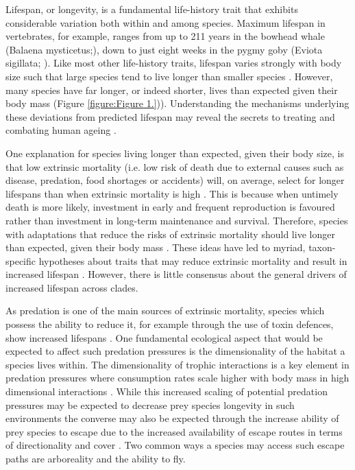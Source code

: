 Lifespan, or longevity, is a fundamental life-history trait that exhibits considerable variation both within and among species. Maximum lifespan in vertebrates, for example, ranges from up to 211 years in the bowhead whale (Balaena mysticetus;\citep{de2009database}), down to just eight weeks in the pygmy goby (Eviota sigillata; \citep{depczynski2005shortest}). Like most other life-history traits, lifespan varies strongly with body size such that large species tend to live longer than smaller species \citep{lindstedt1981body,promislow1993size,de2007analysis,ricklefs2010life}. However, many species have far longer, or indeed shorter, lives than expected given their body mass (Figure \ref{figure:Figure 1.})). Understanding the mechanisms underlying these deviations from predicted lifespan may reveal the secrets to treating and combating human ageing \citep{ricklefs2010insights,zhang2013comparative}. 

One explanation for species living longer than expected, given their body size, is that low extrinsic mortality (i.e. low risk of death due to external causes such as disease, predation, food shortages  or accidents) will, on average, select for longer lifespans than when extrinsic mortality is high \citep{stearns1992evolution,Williams1957}. This is because when untimely death is more likely, investment in early and frequent reproduction is favoured rather than investment in long-term maintenance and survival. Therefore, species with adaptations that reduce the risks of extrinsic mortality should live longer than expected, given their body mass \citep{partridge1993optimality}. These ideas have led to myriad, taxon-specific hypotheses about traits that may reduce extrinsic mortality and result in increased lifespan \citep{ricklefs2010insights}. However, there is little consensus about the general drivers of increased lifespan across clades.

As predation is one of the main sources of extrinsic mortality, species which possess the ability to reduce it, for example through the use of toxin defences, show increased lifespans \citep{hossie2013species}. One fundamental ecological aspect that would be expected to affect such predation pressures is the dimensionality of the habitat a species lives within. The dimensionality of trophic interactions is a key element in predation pressures where consumption rates scale higher with body mass in high dimensional interactions \citep{pawar2012dimensionality}. While this increased scaling of potential predation pressures may be expected to decrease prey species longevity in such environments the converse may also be expected through the increase ability of prey species to escape due to the increased availability of escape routes in terms of directionality and cover \citep{moller2010up}. Two common ways a species may access such escape paths are arboreality and the ability to fly.

